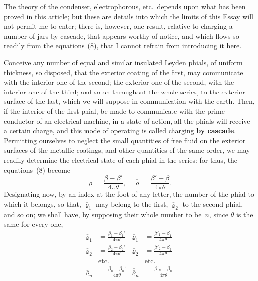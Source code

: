 \documentclass[11pt,notitlepage]{amsart}
\let\Emphasis\textbf
\renewcommand{\rho}{\varrho}
\begin{document}
The theory of the condenser, electrophorous, etc.\ depends upon what
has been proved in this article; but these are details into which the limits of
this Essay will not permit me to enter; there is, however, one result, relative
to charging a number of jars by cascade, that appears worthy of notice,
and which flows so readily from the equations~(8), that I cannot refrain from
introducing it here.

Conceive any number of equal and similar insulated Leyden phials, of
uniform thickness, so disposed, that the exterior coating of the first, may 
communicate with the interior one of the second; the exterior one of the second,
with the interior one of the third; and so on throughout the whole series, to
the exterior surface of the last,
which we will suppose in communication with the
earth. Then, if the interior of the first phial, be made to communicate with
the prime conductor of an electrical machine,
in a state of action, all the phials
will receive a certain charge, and this mode of operating is called charging
\Emphasis{by cascade}. Permitting ourselves
to neglect the small quantities of free fluid on
the exterior surfaces of the metallic coatings, and other quantities of the same
order, we may readily determine
the electrical state of each phial in the series:
for thus, the equations~(8) become
\[
\overline\rho=\frac{\beta-\beta'}{4\pi\theta},\quad
\overline{\overline\rho}=\frac{\beta'-\beta}{4\pi\theta}.
\]
Designating now, by an index at the foot of any letter, the number of the
phial to which it belongs, so that,
$\overline\rho_1$ may belong to the first,
$\overline\rho_2$ to the second
phial, and so on; we shall have, by supposing their whole number to be~$n$,
since $\theta$ is the same for every one,
\begin{align*}
\overline\rho_1 &=\frac{\beta_1-\beta_1'}{4\pi\theta} &
\overline{\overline\rho}_1 &=\frac{\beta'_1-\beta_1}{4\pi\theta}\\
\overline\rho_2 &=\frac{\beta_2-\beta_2'}{4\pi\theta} &
\overline{\overline\rho}_2 &=\frac{\beta'_2-\beta_2}{4\pi\theta}\\
&\text{etc.} &&\text{etc.}\\
\overline\rho_n &=\frac{\beta_n-\beta_n'}{4\pi\theta} &
\overline{\overline\rho}_n &=\frac{\beta'_n-\beta_n}{4\pi\theta}
\end{align*}
\end{document}
